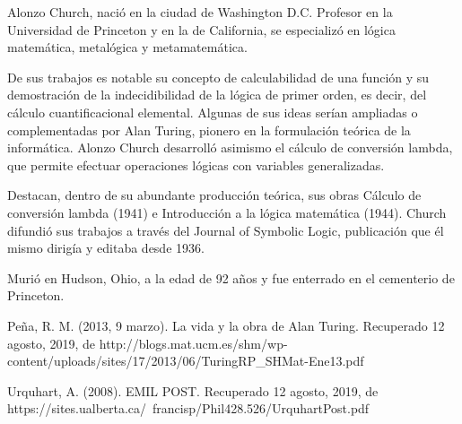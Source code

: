 \documentclass[letterpaper, 11pt]{article}
\begin{document}
Alonzo Church, nació en la ciudad de Washington D.C. Profesor en la Universidad de Princeton y en la de California, se especializó en lógica matemática, metalógica y metamatemática.

\noindent De sus trabajos es notable su concepto de calculabilidad de una función y su demostración de la indecidibilidad de la lógica de primer orden, es decir, del cálculo cuantificacional elemental. Algunas de sus ideas serían ampliadas o complementadas por Alan Turing, pionero en la formulación teórica de la informática. Alonzo Church desarrolló asimismo el cálculo de conversión lambda, que permite efectuar operaciones lógicas con variables generalizadas.

\noindent Destacan, dentro de su abundante producción teórica, sus obras Cálculo de conversión lambda (1941) e Introducción a la lógica matemática (1944). Church difundió sus trabajos a través del Journal of Symbolic Logic, publicación que él mismo dirigía y editaba desde 1936.

\noindent Murió en Hudson, Ohio, a la edad de 92 años y fue enterrado en el cementerio de Princeton.


\begin{thebibliography}{*}
    Peña, R. M. (2013, 9 marzo). La vida y la obra de Alan Turing. Recuperado 12 agosto, 2019, de 
    {http://blogs.mat.ucm.es/shm/wp-content/uploads/sites/17/2013/06/TuringRP\_SHMat-Ene13.pdf}

    Urquhart, A. (2008). EMIL POST. Recuperado 12 agosto, 2019, de https://sites.ualberta.ca/~francisp/Phil428.526/UrquhartPost.pdf


\end{thebibliography}
\end{document}
